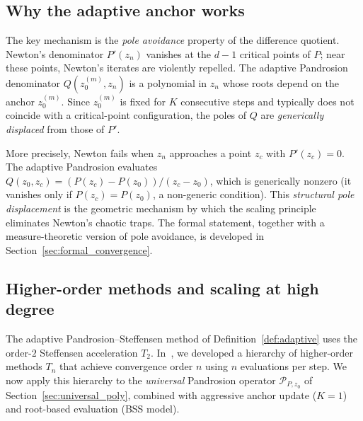 \documentclass[10pt,a4paper,oneside]{book}
\theoremstyle{definition}
\theoremstyle{remark}
\begin{document}
\subsection{Why the adaptive anchor works}

The key mechanism is the \emph{pole avoidance} property of the difference quotient.  Newton's denominator $P'(z_n)$ vanishes at the $d-1$ critical points of $P$; near these points, Newton's iterates are violently repelled.  The adaptive Pandrosion denominator $Q(z_0^{(m)}, z_n)$ is a polynomial in $z_n$ whose roots depend on the anchor $z_0^{(m)}$.  Since $z_0^{(m)}$ is fixed for $K$ consecutive steps and typically does not coincide with a critical-point configuration, the poles of $Q$ are \emph{generically displaced} from those of $P'$.

More precisely, Newton fails when $z_n$ approaches a point $z_c$ with $P'(z_c) = 0$.  The adaptive Pandrosion evaluates $Q(z_0, z_c) = (P(z_c) - P(z_0))/(z_c - z_0)$, which is generically nonzero (it vanishes only if $P(z_c) = P(z_0)$, a non-generic condition).  This \emph{structural pole displacement} is the geometric mechanism by which the scaling principle eliminates Newton's chaotic traps.  The formal statement, together with a measure-theoretic version of pole avoidance, is developed in Section~\ref{sec:formal_convergence}.

\subsection{Higher-order methods and scaling at high degree}
\label{sec:higher_order_smale}

The adaptive Pandrosion--Steffensen method of Definition~\ref{def:adaptive} uses the order-$2$ Steffensen acceleration $T_2$.  In~\cite{besevic2026ho}, we developed a hierarchy of higher-order methods $T_n$ that achieve convergence order $n$ using $n$ evaluations per step.  We now apply this hierarchy to the \emph{universal} Pandrosion operator $\mathcal{P}_{P,z_0}$ of Section~\ref{sec:universal_poly}, combined with aggressive anchor update ($K = 1$) and root-based evaluation (BSS model).
\end{document}

